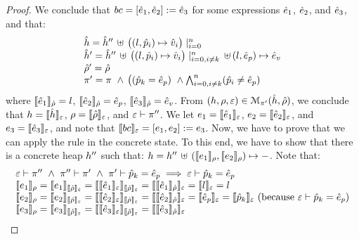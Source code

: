 \begin{proof}
\noindent{}
We conclude that  $\bcmd = [\sexpr_1, \sexpr_2] := \sexpr_3$ for some expressions $\sexpr_1$, $\sexpr_2$, 
and $\sexpr_3$, and that: 
$$
\begin{array}{l}
  \sheap =  \sheap'' \, \uplus \, \big((l, \sexprp_i) \mapsto \sexprv_i\big)\mid_{i = 0}^n    \\
  \sheap' = \sheap'' \, \uplus \,  \big((l, \sexprp_i) \mapsto \sexprv_i\big)\mid_{i = 0, i \neq k}^n \, \uplus \,  (l, \sexpr_p) \mapsto \sexpr_v  \\
  \sstore' = \sstore \\ 
  \pc' = \pc \ \wedge \, \big( (\sexprp_k = \sexpr_p) \ \wedge \bigwedge_{i = 0, i \neq k}^n (\sexprp_i \neq \sexpr_p)
\end{array}
$$ 
where $\symbeval{\sexpr_1}{\sstore} =  \loc$, $\symbeval{\sexpr_2}{\sstore} =  \sexpr_p$, 
$\symbeval{\sexpr_3}{\sstore} =  \sexpr_v$.
From $(\heap, \store, \senv) \in \smodels{\sheap, \sstore}{\pc'}$, we conclude that $\heap = \semexpr{\sheap}{\senv}$, $\store = \semexpr{\sstore}{\senv}$, and 
$\senv \vdash \pc''$. 
We let $\jsilexpr_1 = \symbeval{\sexpr_1}{\senv}$, 
$\jsilexpr_2 = \symbeval{\sexpr_2}{\senv}$, and $\jsilexpr_3 = \symbeval{\sexpr_3}{\senv}$, and note that $\symbeval{\bcmd}{\senv} = [\jsilexpr_1, \jsilexpr_2] := \jsilexpr_3$.
Now, we have to prove that we can apply the  rule in the concrete state.
To this end, we have to show that there is a concrete heap $\heap''$ such that:
$\heap = \heap'' \dunion \hcell{\symbeval{\jsilexpr_1}{\store}}{\symbeval{\jsilexpr_2}{\store}}{-}$. 
Note that: 
$$
\begin{array}{l}
%
\senv \vdash \pc'' \ \wedge \ \pc'' \vdash \pc' \ \wedge \ \pc' \vdash \sexprp_k = \sexpr_p \implies \senv \vdash \sexprp_k = \sexpr_p \\
%
 \symbeval{\jsilexpr_1}{\store} = \symbeval{\jsilexpr_1}{\symbeval{\sstore}{\senv}} = \symbeval{\symbeval{\sexpr_1}{\senv}}{\symbeval{\sstore}{\senv}} = \symbeval{\symbeval{\sexpr_1}{\sstore}}{\senv} 
    = \symbeval{\loc}{\senv} = \loc \\ 
  \symbeval{\jsilexpr_2}{\store}  = \symbeval{\jsilexpr_2}{\semexpr{\sstore}{\senv}} =  \symbeval{\symbeval{\sexpr_2}{\senv}}{\symbeval{\sstore}{\senv}} = \symbeval{\symbeval{\sexpr_2}{\sstore}}{\senv}
   =  \symbeval{\sexpr_p}{\senv} = \symbeval{\sexprp_k}{\senv}  \text{ (because $\senv \vdash \sexprp_k = \sexpr_p$)} \\
  \symbeval{\jsilexpr_3}{\store}  = \symbeval{\jsilexpr_3}{\semexpr{\sstore}{\senv}} =  \symbeval{\symbeval{\sexpr_3}{\senv}}{\symbeval{\sstore}{\senv}} = \symbeval{\symbeval{\sexpr_3}{\sstore}}{\senv}

\end{array}$$
\end{proof}
